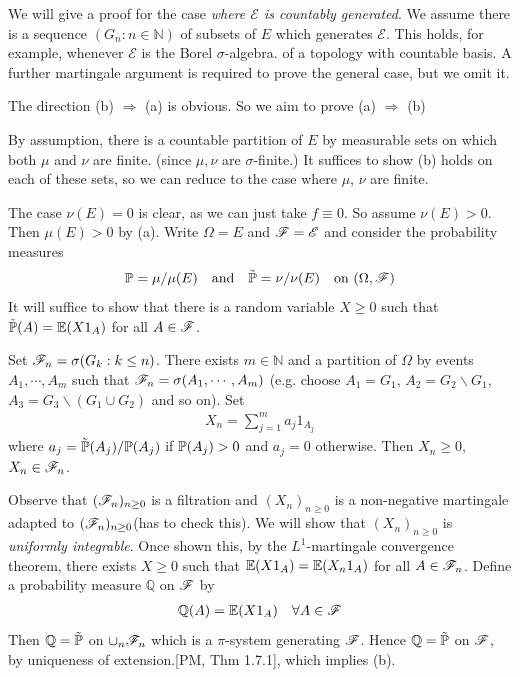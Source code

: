 \documentclass[10pt,a4paper]{report}
\newenvironment{proof}
{\begin{changemargin}{1cm}{0.5cm} 
	}%
	{\end{changemargin}
}
\begin{document}
We will give a proof for the case \emph{where $\mathscr{E}$ is countably generated}. We assume there is a sequence $(G_n : n \in \mathbb{N})$ of subsets of $E$ which generates $\mathscr{E}$. This holds, for example, whenever $\mathscr{E}$ is the Borel $\sigma$-algebra. of a topology with countable basis. A further martingale argument is required to prove the general case, but we omit it.
\begin{proof}
\pf The direction (b) $\Rightarrow$ (a) is obvious. So we aim to prove (a) $\Rightarrow$ (b)

\quad By assumption, there is a countable partition of $E$ by measurable sets on which both $\mu$ and $\nu$ are finite. (since $\mu,\nu$ are $\sigma$-finite.) It suffices to show (b) holds on each of these sets, so we can reduce to the case where $\mu$, $\nu$ are finite.

\quad The case $\nu(E) =0$ is clear, as we can just take $f\equiv 0$. So assume $\nu(E) >0$. Then $\mu(E)>0$ by (a). Write $\Omega = E$ and $\mathscr{F} = \mathscr{E}$ and consider the probability measures
\begin{align*}
\mathbb{P} = \mu / \mu(E) \quad \text{and} \quad \tilde{\mathbb{P}} = \nu/\nu(E) \quad \text{on } (\Omega, \mathscr{F})
\end{align*}
It will suffice to show that there is a random variable $X \geq 0$ such that $\tilde{\mathbb{P}}(A) = \mathbb{E}(X 1_A)$ for all $A\in \mathscr{F}$.

\quad Set $\mathscr{F}_n = \sigma(G_k : k\leq n)$. There exists $m \in \mathbb{N}$ and a partition of $\Omega$ by events $A_1, \cdots, A_m$ such that $\mathscr{F}_n = \sigma (A_1, \cdots, A_m)$ (e.g. choose $A_1 = G_1$, $A_2 = G_2 \backslash G_1$, $A_3 = G_3\backslash (G_1 \cup G_2)$ and so on). Set 
\begin{align*}
X_n = \sum_{j=1}^m a_{j} 1_{A_j}
\end{align*}
where $a_j = \tilde{\mathbb{P}}(A_j) / \mathbb{P}(A_j)$ if $\mathbb{P}(A_j)>0$ and $a_j =0$ otherwise. Then $X_n \geq 0$, $X_n \in \mathscr{F}_n$.

\quad Observe that $(\mathscr{F}_n)_{n\geq 0}$ is a filtration and $(X_n)_{n\geq 0}$ is a non-negative martingale adapted to $(\mathscr{F}_n)_{n\geq 0}$(has to check this). We will show that $(X_n)_{n\geq 0}$ is \emph{uniformly integrable}. Once shown this, by the $L^1$-martingale convergence theorem, there exists $X\geq 0$ such that $\mathbb{E}(X 1_A) = \mathbb{E}(X_n 1_A)$ for all $A \in \mathscr{F}_n$. Define a probability measure $\mathbb{Q}$ on $\mathscr{F}$ by
\begin{align*}
\mathbb{Q}(A) = \mathbb{E}(X 1_A) \quad \forall A \in \mathscr{F}
\end{align*}
Then $\mathbb{Q} = \tilde{\mathbb{P}}$ on $\cup_n \mathscr{F}_n$ which is a $\pi$-system generating $\mathscr{F}$. Hence $\mathbb{Q} = \tilde{\mathbb{P}}$ on $\mathscr{F}$, by uniqueness of extension.[PM, Thm 1.7.1], which implies (b).


\end{proof}
\end{document}
